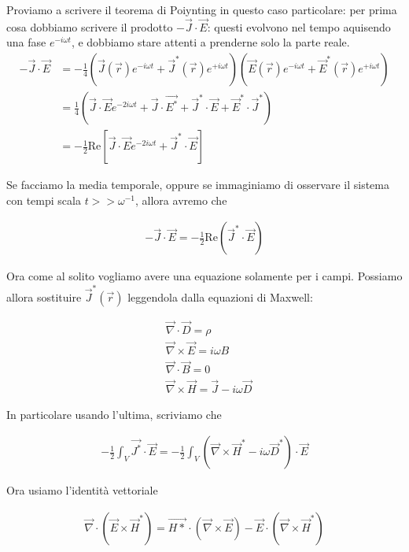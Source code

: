 \documentclass{report}
\begin{document}
Proviamo a scrivere il teorema di Poiynting in questo caso particolare: per prima cosa dobbiamo scrivere il prodotto \(-\vec{J}\cdot \vec{E}\): questi evolvono nel tempo aquisendo una fase \(e^{-i\omega t}\), e dobbiamo stare attenti a prenderne solo la parte reale.\\

\begin{align}
    -\vec{J}\cdot \vec{E} &= -\frac{1}{4}\left( \vec{J}(\vec{r})e^{-i\omega t} + \vec{J}^*(\vec{r})e^{+i\omega t}\right)\left(\vec{E}(\vec{r})e^{-i\omega t} + \vec{E}^*(\vec{r})e^{+i\omega t} \right) \\
    &= \frac{1}{4}(\vec{J}\cdot \vec{E}e^{-2i\omega t} + \vec{J}\cdot \vec{E^*} + \vec{J}^*\cdot \vec{E} + \vec{E}^*\cdot \vec{J}^*) \\
    &= -\frac{1}{2}\text{Re}[\vec{J}\cdot \vec{E}e^{-2 i \omega t} + \vec{J}^*\cdot \vec{E}]
\end{align}

Se facciamo la media temporale, oppure se immaginiamo di osservare il sistema con tempi scala \(t >> \omega^{-1}\), allora avremo che 

\begin{align}
    -\vec{J}\cdot \vec{E} = -\frac{1}{2}\text{Re}(\vec{J}^* \cdot \vec{E})
\end{align}

Ora come al solito vogliamo avere una equazione solamente per i campi. Possiamo allora sostituire \(\vec{J}^*(\vec{r})\) leggendola dalla equazioni di Maxwell: 

\begin{align}
    &\vec{\nabla}\cdot \vec{D} = \rho \\
    &\vec{\nabla}\times \vec{E} = i\omega B \\
    &\vec{\nabla} \cdot \vec{B} = 0 \\
    &\vec{\nabla} \times \vec{H} = \vec{J} -i \omega \vec{D}
\end{align}

In particolare usando l'ultima, scriviamo che 

\begin{align}
    -\frac{1}{2}\int_V \vec{J^*}\cdot \vec{E} = -\frac{1}{2}\int_V (\vec{\nabla}\times \vec{H}^* -i\omega \vec{D}^*)\cdot \vec{E}
\end{align}

Ora usiamo l'identità vettoriale 

\begin{align}
    \vec{\nabla}\cdot (\vec{E}\times \vec{H}^*) = \vec{H*}\cdot (\vec{\nabla}\times \vec{E}) - \vec{E}\cdot (\vec{\nabla}\times \vec{H}^*)
\end{align}
\end{document}
